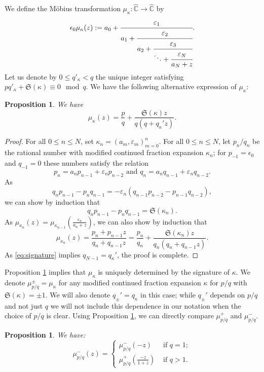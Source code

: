 \documentclass[12pt,letterpaper]{amsart}
\numberwithin{equation}{section}
\newtheorem{prop}[equation]{Proposition}
\theoremstyle{remark}
\theoremstyle{definition}
\begin{document}
	
	We define the M\"obius transformation $\mu_\kappa: \hat{\mathbb{C}}\to \hat{\mathbb{C}}$ by 
	\begin{equation*}\label{definition of mu}
		\epsilon_0\mu_{\kappa}(z) :=a_0+ \cfrac{\varepsilon_1}{a_1+\cfrac{\varepsilon_2}{a_2+\cfrac{\varepsilon_3}{\ddots+\cfrac{\varepsilon_N}{a_N+z}}}}.
	\end{equation*}
	Let us denote by $0\leq q'_\kappa < q$ the unique integer satisfying $pq'_\kappa + \mathfrak{S}(\kappa)\equiv 0 \mod q$.
	We have the following alternative expression of $\mu_\kappa$:
	\begin{prop}\label{prop:mobius form}
		We have
		$$\mu_{\kappa}(z) = \frac{p}{q}+\frac{\mathfrak{S}(\kappa)z}{q(q+ q_\kappa' z)}.$$
	\end{prop}
	
	\begin{proof}
		For all $0\leq n \leq N$, set  $\kappa_n = ( a_m, \varepsilon_m)_{m=0}^n$. 
		For all $0\leq n \leq N$, let $p_n/q_n$ be the rational number with modified continued fraction expansion $\kappa_n$; for $p_{-1} = \epsilon_0$ and $q_{-1} = 0$ these numbers satisfy the relation
		$$p_n= a_n p_{n-1} +\varepsilon_n p_{n-2}\text{ and }q_n= a_n q_{n-1} +\varepsilon_n q_{n-2}.$$
		As $$q_np_{n -1}- p_nq_{n-1} = -\varepsilon_n(q_{n-1}p_{n-2}- p_{n-1}q_{n-2}),$$
		we can show by induction that 
		\begin{equation}\label{eq:signature}
			q_np_{n-1}-p_nq_{n-1} = \mathfrak{S}(\kappa_n).
		\end{equation}		
		As $\mu_{\kappa_n}(z) = \mu_{\kappa_{n-1}}\left(\frac{\varepsilon_n}{a_n+ z}\right)$, we can also show by induction that 
		$$\mu_{\kappa_n}(z) = \frac{p_n+p_{n-1}z}{q_n+q_{n-1}z} =  \frac{p_n}{q_n} + \frac{\mathfrak{S}(\kappa_n)z}{q_n(q_n+q_{n-1}z)} .$$
		As \eqref{eq:signature} implies $q_{N-1} = q_{\kappa}'$, the proof is complete.
	\end{proof}
	
	Proposition \ref{prop:mobius form}  implies that $\mu_\kappa$ is uniquely determined by the signature of $\kappa$. We denote $\mu_{p/q}^\pm= \mu_\kappa$ for any modified continued fraction expansion $\kappa$ for $p/q$ with $\mathfrak{S}(\kappa) = \pm 1$. We will also denote $q_\pm' = q_\kappa$ in this case; while $q_\pm'$ depends on $p/q$ and not just $q$ we will not include this dependence in our notation when the choice of $p/q$ is clear.
	Using Proposition \ref{prop:mobius form}, we can directly compare $\mu_{p/q}^+$ and $\mu_{p/q}^-$. 
	
	\begin{prop}
		We have:
		$$\mu_{p/q}^- (z) = 
		\begin{cases}
			\mu_{p/q}^-(-z) & \text{ if } q= 1;\\
			\mu_{p/q}^+\left(\frac{-z}{1+z}\right) &\text{ if }q>1.
		\end{cases}
		$$
	\end{prop}
	
\end{document}
